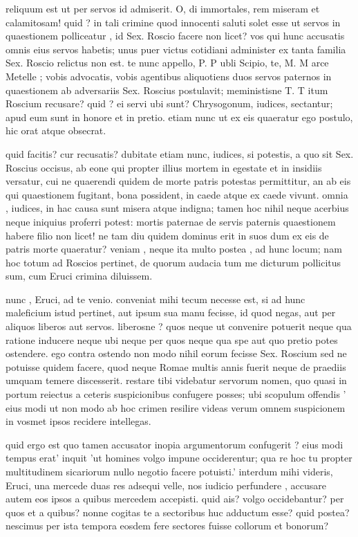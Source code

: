  reliquum est ut per servos id admiserit. O, di immortales, rem miseram et calamitosam! quid ? in tali crimine quod innocenti saluti solet esse ut servos in quaestionem polliceatur , id Sex. Roscio facere non licet? vos qui hunc accusatis omnis eius servos habetis; unus puer victus cotidiani administer ex tanta familia Sex. Roscio relictus non est. te nunc appello, P. P ubli Scipio, te, M. M arce Metelle ; vobis advocatis, vobis agentibus aliquotiens duos servos paternos in quaestionem ab adversariis Sex. Roscius postulavit; meministisne T. T itum Roscium recusare? quid ? ei servi ubi sunt? Chrysogonum, iudices, sectantur; apud eum sunt in honore et in pretio. etiam nunc ut ex eis quaeratur ego postulo, hic orat atque obsecrat.

 quid facitis? cur recusatis? dubitate etiam nunc, iudices, si potestis, a quo sit Sex. Roscius occisus, ab eone qui propter illius mortem in egestate et in insidiis versatur, cui ne quaerendi quidem de morte patris potestas permittitur, an ab eis qui quaestionem fugitant, bona possident, in caede atque ex caede vivunt. omnia , iudices, in hac causa sunt misera atque indigna; tamen hoc nihil neque acerbius neque iniquius proferri potest: mortis paternae de servis paternis quaestionem habere filio non licet! ne tam diu quidem dominus erit in suos dum ex eis de patris morte quaeratur? veniam , neque ita multo postea , ad hunc locum; nam hoc totum ad Roscios pertinet, de quorum audacia tum me dicturum pollicitus sum, cum Eruci crimina diluissem.

 nunc , Eruci, ad te venio. conveniat mihi tecum necesse est, si ad hunc maleficium istud pertinet, aut ipsum sua manu fecisse, id quod negas, aut per aliquos liberos aut servos. liberosne ? quos neque ut convenire potuerit neque qua ratione inducere neque ubi neque per quos neque qua spe aut quo pretio potes ostendere. ego contra ostendo non modo nihil eorum fecisse Sex. Roscium sed ne potuisse quidem facere, quod neque Romae multis annis fuerit neque de praediis umquam temere discesserit. restare tibi videbatur servorum nomen, quo quasi in portum reiectus a ceteris suspicionibus confugere posses; ubi scopulum offendis ' eius modi ut non modo ab hoc crimen resilire videas verum omnem suspicionem in vosmet ipsos recidere intellegas.

 quid ergo est quo tamen accusator inopia argumentorum confugerit ? eius modi tempus erat' inquit 'ut homines volgo impune occiderentur; qua re hoc tu propter multitudinem sicariorum nullo negotio facere potuisti.' interdum mihi videris, Eruci, una mercede duas res adsequi velle, nos iudicio perfundere , accusare autem eos ipsos a quibus mercedem accepisti. quid ais? volgo occidebantur? per quos et a quibus? nonne cogitas te a sectoribus huc adductum esse? quid postea? nescimus per ista tempora eosdem fere sectores fuisse collorum et bonorum?


